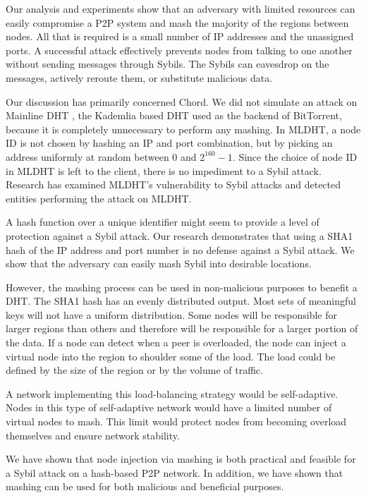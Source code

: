 \documentclass[11pt,conference]{IEEEtran}
\begin{document}
Our analysis and experiments show that an adversary with limited resources can easily compromise a P2P system and mash the majority of the regions between nodes.
All that is required is a small number of IP addresses and the unassigned ports.
A successful attack effectively prevents nodes from talking to one another without sending messages through Sybils.
The Sybils can eavesdrop on the messages, actively reroute them, or substitute malicious data.

Our discussion has primarily concerned Chord.
We did not simulate an attack on Mainline DHT  \cite{mainline}, the Kademlia \cite{kademlia} based DHT used as the backend of BitTorrent, because it is completely unnecessary to perform any mashing.
In MLDHT, a node ID is not chosen by hashing an IP and port combination, but by picking an address uniformly at random between 0 and $2^{160}-1$.
Since the choice of node ID in MLDHT is left to the client, there is no impediment to a Sybil attack. 
Research has examined MLDHT's vulnerability to Sybil attacks \cite{sybilbit} and detected entities performing the attack on MLDHT.

A hash function over a unique identifier might seem to provide a level of protection against a Sybil attack.
Our research demonstrates that using a SHA1 hash of the IP address and port number is no defense against a Sybil attack. 
We show that the adversary can easily mash Sybil into desirable locations.


However, the mashing process can be used in non-malicious purposes to benefit a DHT.
The SHA1 hash has an evenly distributed output. 
Most sets of meaningful keys will not have a uniform distribution. %
Some nodes will be responsible for larger regions than others and therefore will be responsible for a larger portion of the data.
If a node can detect when a peer is overloaded, the node can inject a virtual node into the region to shoulder some of the load.
The load could be defined by the size of the region or by the volume of traffic.

A network implementing this load-balancing strategy would be self-adaptive.
Nodes in this type of self-adaptive network would have a limited number of virtual nodes to mash.
This limit would protect nodes from becoming overload themselves and ensure network stability.

We have shown that node injection via mashing is both practical and feasible for a Sybil attack on a hash-based P2P network.
In addition, we have shown that mashing can be used for both malicious and beneficial purposes.




\end{document}

